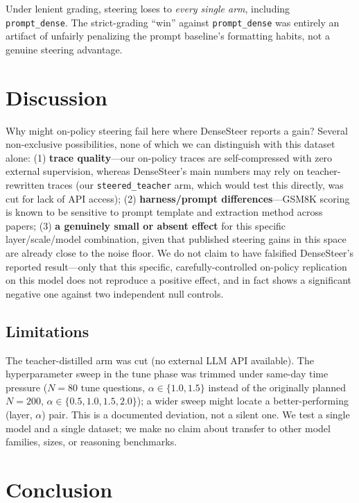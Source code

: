 \documentclass[11pt]{article}
\begin{document}
Under lenient grading, steering loses to \emph{every single arm}, including \texttt{prompt\_dense}.
The strict-grading ``win'' against \texttt{prompt\_dense} was entirely an artifact of unfairly
penalizing the prompt baseline's formatting habits, not a genuine steering advantage.

\section{Discussion}

Why might on-policy steering fail here where DenseSteer reports a gain? Several
non-exclusive possibilities, none of which we can distinguish with this dataset alone: (1)
\textbf{trace quality}---our on-policy traces are self-compressed with zero external
supervision, whereas DenseSteer's main numbers may rely on teacher-rewritten traces (our
\texttt{steered\_teacher} arm, which would test this directly, was cut for lack of API access);
(2) \textbf{harness/prompt differences}---GSM8K scoring is known to be sensitive to prompt
template and extraction method across papers; (3) \textbf{a genuinely small or absent effect}
for this specific layer/scale/model combination, given that published steering gains in this
space are already close to the noise floor. We do not claim to have falsified DenseSteer's
reported result---only that this specific, carefully-controlled on-policy replication on this
model does not reproduce a positive effect, and in fact shows a significant negative one against
two independent null controls.

\subsection*{Limitations}
The teacher-distilled arm was cut (no external LLM API available). The hyperparameter sweep in
the tune phase was trimmed under same-day time pressure ($N=80$ tune questions,
$\alpha \in \{1.0, 1.5\}$ instead of the originally planned $N=200$,
$\alpha \in \{0.5, 1.0, 1.5, 2.0\}$); a wider sweep might locate a better-performing
(layer, $\alpha$) pair. This is a documented deviation, not a silent one. We test a single model
and a single dataset; we make no claim about transfer to other model families, sizes, or
reasoning benchmarks.

\section{Conclusion}
\end{document}

